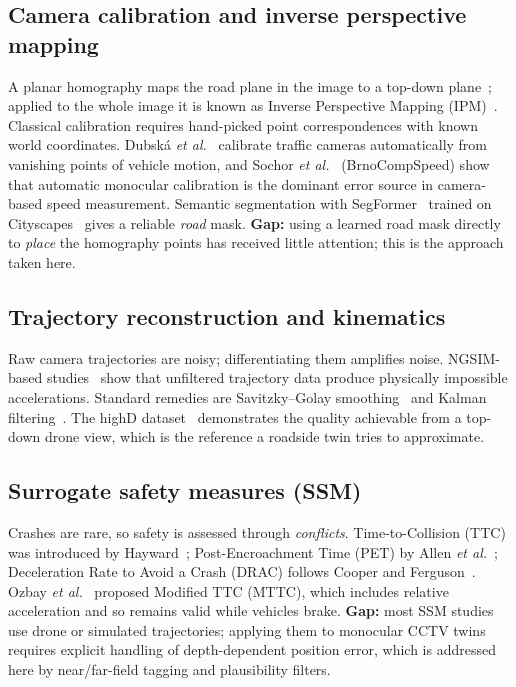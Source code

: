 \documentclass[11pt,a4paper]{article}
\begin{document}
\subsection{Camera calibration and inverse perspective mapping}
A planar homography maps the road plane in the image to a top-down plane~\cite{hartley2004}; applied to the whole image
it is known as Inverse Perspective Mapping (IPM)~\cite{mallot1991}. Classical calibration requires hand-picked point
correspondences with known world coordinates. Dubsk\'{a} \emph{et al.}~\cite{dubska2014} calibrate traffic cameras
automatically from vanishing points of vehicle motion, and Sochor \emph{et al.}~\cite{sochor2019} (BrnoCompSpeed) show
that automatic monocular calibration is the dominant error source in camera-based speed measurement.
Semantic segmentation with SegFormer~\cite{xie2021} trained on Cityscapes~\cite{cordts2016} gives a reliable
\emph{road} mask. \textbf{Gap:} using a learned road mask directly to \emph{place} the homography points has
received little attention; this is the approach taken here.

\subsection{Trajectory reconstruction and kinematics}
Raw camera trajectories are noisy; differentiating them amplifies noise. NGSIM-based studies~\cite{montanino2015,punzo2011}
show that unfiltered trajectory data produce physically impossible accelerations. Standard remedies are
Savitzky--Golay smoothing~\cite{savitzky1964} and Kalman filtering~\cite{kalman1960}. The highD dataset~\cite{krajewski2018}
demonstrates the quality achievable from a top-down drone view, which is the reference a roadside twin tries to approximate.

\subsection{Surrogate safety measures (SSM)}
Crashes are rare, so safety is assessed through \emph{conflicts}. Time-to-Collision (TTC) was introduced by
Hayward~\cite{hayward1972}; Post-Encroachment Time (PET) by Allen \emph{et al.}~\cite{allen1978}; Deceleration Rate
to Avoid a Crash (DRAC) follows Cooper and Ferguson~\cite{cooper1976}. Ozbay \emph{et al.}~\cite{ozbay2008} proposed
Modified TTC (MTTC), which includes relative acceleration and so remains valid while vehicles brake.
\textbf{Gap:} most SSM studies use drone or simulated trajectories; applying them to monocular CCTV twins requires
explicit handling of depth-dependent position error, which is addressed here by near/far-field tagging and
plausibility filters.
\end{document}
